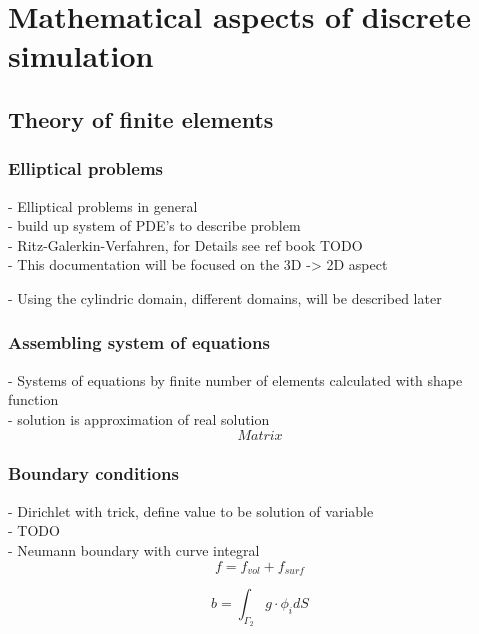 \documentclass[parskip=half, titlepage=yes, 12pt, BCOR=12mm, DIV=calc]{scrartcl}
\begin{document}
\section{Mathematical aspects of discrete simulation}

\subsection{Theory of finite elements}

\subsubsection{Elliptical problems}
- Elliptical problems in general \\
- build up system of PDE's to describe problem \\

- Ritz-Galerkin-Verfahren, for Details see ref book TODO \\
- This documentation will be focused on the 3D -> 2D aspect


- Using the cylindric domain, different domains, will be described later \\


\subsubsection{Assembling system of equations}
- Systems of equations by finite number of elements calculated with shape function \\
- solution is approximation of real solution \\

\begin{equation}
    Matrix
\end{equation}

\subsubsection{Boundary conditions}
- Dirichlet with trick, define value to be solution of variable \\
- TODO \\


- Neumann boundary with curve integral \\

\begin{equation}
    f = f_{vol} + f_{surf}
\end{equation}

\begin{equation}
    b = \int_{\Gamma_2} g \cdot \phi_{i} d S 
\end{equation}
\end{document}
